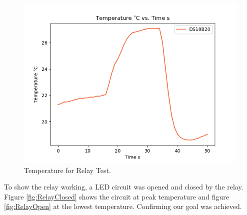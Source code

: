 \documentclass[12pt]{article}
\begin{document}
        \begin{figure}[H] 
            \centering
            \includegraphics*[scale = 0.4]{images/RelayAutoTest.png}
            \caption{Temperature  for Relay Test.}
            \label{fig:RelayAuto}
        \end{figure}

        To show the relay working, a LED circuit was opened and closed by the relay. Figure \ref{fig:RelayClosed} shows the circuit at peak temperature and figure \ref{fig:RelayOpen} at the lowest temperature. Confirming our goal was achieved.         
\end{document}
